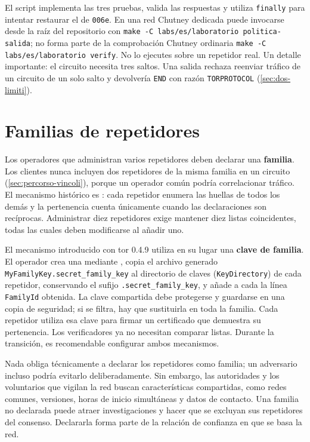 El script  implementa las tres pruebas, valida las respuestas y utiliza \texttt{finally} para intentar restaurar el  de \texttt{006e}. En una red Chutney dedicada puede invocarse desde la raíz del repositorio con \texttt{make -C labs/es/laboratorio politica-salida}; no forma parte de la comprobación Chutney ordinaria \texttt{make -C labs/es/laboratorio verify}. No lo ejecutes sobre un repetidor real. Un detalle importante: el circuito necesita tres saltos. Una salida rechaza reenviar tráfico de un circuito de un solo salto y devolvería \texttt{END} con razón \texttt{TORPROTOCOL} (\cref{sec:dos-limiti}).

\section{Familias de repetidores}\label{sec:relay-famiglie}

Los operadores que administran varios repetidores deben declarar una \textbf{familia}. Los clientes nunca incluyen dos repetidores de la misma familia en un circuito (\cref{sec:percorso-vincoli}), porque un operador común podría correlacionar tráfico. El mecanismo histórico es : cada repetidor enumera las huellas de todos los demás y la pertenencia cuenta únicamente cuando las declaraciones son recíprocas. Administrar diez repetidores exige mantener diez listas coincidentes, todas las cuales deben modificarse al añadir uno.

El mecanismo introducido con tor 0.4.9 utiliza en su lugar una \textbf{clave de familia}. El operador crea una mediante , copia el archivo generado \texttt{MyFamilyKey.secret\_family\_key} al directorio de claves (\texttt{KeyDirectory}) de cada repetidor, conservando el sufijo \texttt{.secret\_family\_key}, y añade a cada  la línea \texttt{FamilyId} obtenida. La clave compartida debe protegerse y guardarse en una copia de seguridad; si se filtra, hay que sustituirla en toda la familia. Cada repetidor utiliza esa clave para firmar un certificado que demuestra su pertenencia. Los verificadores ya no necesitan comparar listas. Durante la transición, es recomendable configurar ambos mecanismos.

\begin{approfondimento}
Nada obliga técnicamente a declarar los repetidores como familia; un adversario incluso podría evitarlo deliberadamente. Sin embargo, las autoridades y los voluntarios que vigilan la red buscan características compartidas, como redes comunes, versiones, horas de inicio simultáneas y datos de contacto. Una familia no declarada puede atraer investigaciones y hacer que se excluyan sus repetidores del consenso. Declararla forma parte de la relación de confianza en que se basa la red.
\end{approfondimento}

